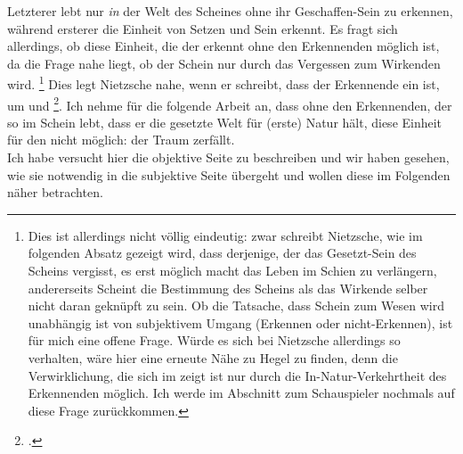 \documentclass[12pt, a4paper, openany]{report}
\begin{document}
Letzterer lebt nur \emph{in} der Welt des Scheines ohne ihr Geschaffen-Sein zu erkennen, während ersterer die Einheit von Setzen und Sein erkennt. 
Es fragt sich allerdings, ob diese Einheit, die der  erkennt ohne den Erkennenden möglich ist, da die Frage nahe liegt, ob der Schein nur durch das Vergessen zum Wirkenden wird.%
\footnote{
    Dies ist allerdings nicht völlig eindeutig: 
    zwar schreibt Nietzsche, wie im folgenden Absatz gezeigt wird, dass derjenige, der das Gesetzt-Sein des Scheins vergisst, es erst möglich macht das Leben im Schien zu verlängern, andererseits Scheint die Bestimmung des Scheins als das Wirkende selber nicht daran geknüpft zu sein. 
    Ob die Tatsache, dass Schein zum Wesen wird unabhängig ist von subjektivem Umgang (Erkennen oder nicht-Erkennen), ist für mich eine offene Frage. 
    Würde es sich bei Nietzsche allerdings so verhalten, wäre hier eine erneute Nähe zu Hegel zu finden, denn die Verwirklichung, die sich im  zeigt ist nur durch die In-Natur-Verkehrtheit des Erkennenden möglich.
    Ich werde im Abschnitt zum Schauspieler nochmals auf diese Frage zurückkommen.
}
Dies legt Nietzsche nahe, wenn er schreibt, dass der Erkennende ein  ist, um  und \footcite[][§ 54, S. 417]{nietzsche_morgenrote_1999}.
Ich nehme für die folgende Arbeit an, dass ohne den Erkennenden, der so im Schein lebt, dass er die gesetzte Welt für (erste) Natur hält, diese Einheit für den  nicht möglich: der Traum zerfällt.\\
Ich habe versucht hier die objektive Seite zu beschreiben und wir haben gesehen, wie sie notwendig in die subjektive Seite übergeht und wollen diese im Folgenden näher betrachten.
\end{document}
